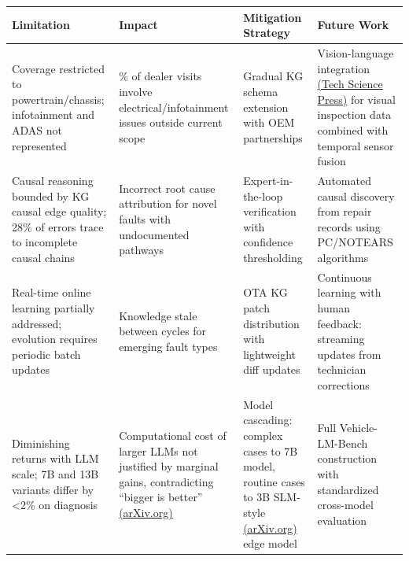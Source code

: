 \documentclass[
  11pt,
]{article}
\newcounter{none} %
\begin{document}
{\def\LTcaptype{none} %
\begin{longtable}[]{@{}
  >{\raggedright\arraybackslash}p{}
  >{\raggedright\arraybackslash}p{}
  >{\raggedright\arraybackslash}p{}
  >{\raggedright\arraybackslash}p{}@{}}
\toprule\noalign{}
\begin{minipage}[b]{\linewidth}\raggedright
Limitation
\end{minipage} & \begin{minipage}[b]{\linewidth}\raggedright
Impact
\end{minipage} & \begin{minipage}[b]{\linewidth}\raggedright
Mitigation Strategy
\end{minipage} & \begin{minipage}[b]{\linewidth}\raggedright
Future Work
\end{minipage} \\
\midrule\noalign{}
\endhead
\bottomrule\noalign{}
\endlastfoot
Coverage restricted to powertrain/chassis; infotainment and ADAS not
represented & 23\% of dealer visits involve electrical/infotainment
issues outside current scope & Gradual KG schema extension with OEM
partnerships & Vision-language integration
\href{https://www.techscience.com/CMES/online/detail/26431}{(Tech
Science Press)} for visual inspection data combined with temporal sensor
fusion \\
Causal reasoning bounded by KG causal edge quality; 28\% of errors trace
to incomplete causal chains & Incorrect root cause attribution for novel
faults with undocumented pathways & Expert-in-the-loop verification with
confidence thresholding & Automated causal discovery from repair records
using PC/NOTEARS algorithms \\
Real-time online learning partially addressed; evolution requires
periodic batch updates & Knowledge stale between cycles for emerging
fault types & OTA KG patch distribution with lightweight diff updates &
Continuous learning with human feedback: streaming updates from
technician corrections \\
Diminishing returns with LLM scale; 7B and 13B variants differ by
\textless2\% on diagnosis & Computational cost of larger LLMs not
justified by marginal gains, contradicting ``bigger is better''
\href{https://arxiv.org/html/2406.16964v2}{(arXiv.org)} & Model
cascading: complex cases to 7B model, routine cases to 3B SLM-style
\href{https://arxiv.org/html/2501.02342v1}{(arXiv.org)} edge model &
Full Vehicle-LM-Bench construction with standardized cross-model
evaluation \\
\end{longtable}
}
\end{document}
